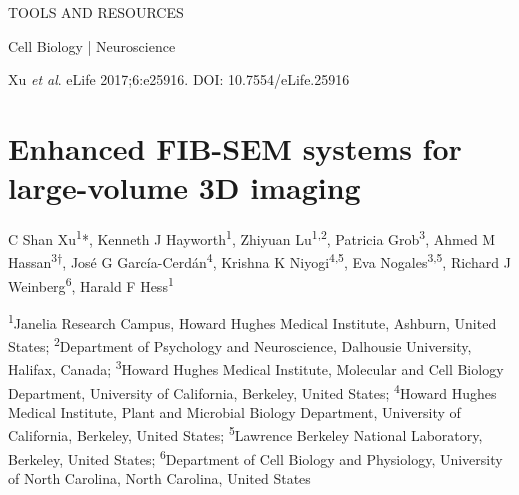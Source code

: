 \documentclass{article}
\begin{document}

\noindent TOOLS AND RESOURCES\par
\noindent Cell Biology | Neuroscience\par
\noindent Xu \emph{et al}. eLife 2017;6:e25916. DOI: 10.7554/eLife.25916\par

\section*{Enhanced FIB-SEM systems for large-volume 3D imaging}

\noindent C Shan Xu\textsuperscript{1}*, Kenneth J Hayworth\textsuperscript{1}, Zhiyuan Lu\textsuperscript{1,2}, Patricia Grob\textsuperscript{3}, Ahmed M Hassan\textsuperscript{3†}, José G García-Cerdán\textsuperscript{4}, Krishna K Niyogi\textsuperscript{4,5}, Eva Nogales\textsuperscript{3,5}, Richard J Weinberg\textsuperscript{6}, Harald F Hess\textsuperscript{1}

\noindent\textsuperscript{1}Janelia Research Campus, Howard Hughes Medical Institute, Ashburn, United States; \textsuperscript{2}Department of Psychology and Neuroscience, Dalhousie University, Halifax, Canada; \textsuperscript{3}Howard Hughes Medical Institute, Molecular and Cell Biology Department, University of California, Berkeley, United States; \textsuperscript{4}Howard Hughes Medical Institute, Plant and Microbial Biology Department, University of California, Berkeley, United States; \textsuperscript{5}Lawrence Berkeley National Laboratory, Berkeley, United States; \textsuperscript{6}Department of Cell Biology and Physiology, University of North Carolina, North Carolina, United States
\end{document}

